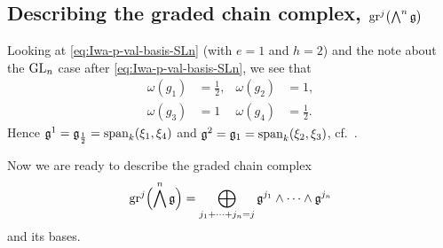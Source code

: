 \subsection{Describing the graded chain complex, \texorpdfstring{$\operatorname{gr}^{j}\bigl(\bigwedge^{n}\mathfrak{g}\bigr)$}{grj(wedge-n g)}}%
\label{subsec:graded-complex-GL2}

Looking at \eqref{eq:Iwa-p-val-basis-SLn} (with $e=1$ and $h=2$) and the note about the $\operatorname{GL}_{n}$ case after \eqref{eq:Iwa-p-val-basis-SLn}, we see that
\begin{align*}
  \omega(g_{1}) &= \frac{1}{2}, & \omega(g_{2}) &= 1, \\
  \omega(g_{3}) &= 1 & \omega(g_{4}) &= \frac{1}{2}.
\end{align*}
Hence $\mathfrak{g}^{1} = \mathfrak{g}_{\frac{1}{2}} = \operatorname{span}_{k}(\xi_{1},\xi_{4})$ and $\mathfrak{g}^{2} = \mathfrak{g}_{1} = \operatorname{span}_{k}(\xi_{2},\xi_{3})$, cf.\ .

Now we are ready to describe the graded chain complex
\begin{equation*}
  \operatorname{gr}^{j}\Bigl( \bigwedge^{n}\mathfrak{g} \Bigr) = \bigoplus_{j_{1} + \dotsb + j_{n} = j} \mathfrak{g}^{j_{1}} \wedge \dotsb \wedge \mathfrak{g}^{j_{n}}
\end{equation*}
and its bases.

